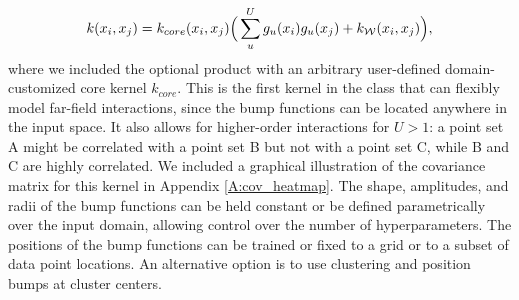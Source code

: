 \documentclass{article}
\renewcommand{\mathbf}[1]{%
  \ifx#1x x\else \textbf{#1}\fi
}
\begin{document}
\begin{align}
\label{eq:bump_kernel}
    k(\mathbf{x}_i,\mathbf{x}_j) = k_{core}(\mathbf{x}_i,\mathbf{x}_j) \Big( \sum_u^U g_u(\mathbf{x}_i) g_u(\mathbf{x}_j) + k_{\mathcal{W}}(\mathbf{x}_i,\mathbf{x}_j) \Big),
\end{align}
where we included the optional product with an arbitrary user-defined domain-customized core kernel $k_{core}$.
This is the first kernel in the class that can flexibly model far-field interactions, since the bump functions can be located anywhere in the input space. It also allows for higher-order interactions for $U>1$: a point set A might be correlated with a point set B but not with a point set C, while B and C are highly correlated. We included a graphical illustration of the covariance matrix for this kernel in Appendix \ref{A:cov_heatmap}. The shape, amplitudes, and radii of the bump functions can be held constant or be defined parametrically over the input domain, allowing control over the number of hyperparameters. The positions of the bump functions can be trained or fixed to a grid or to a subset of data point locations. An alternative option is to use clustering and position bumps at cluster centers. 

\end{document}
